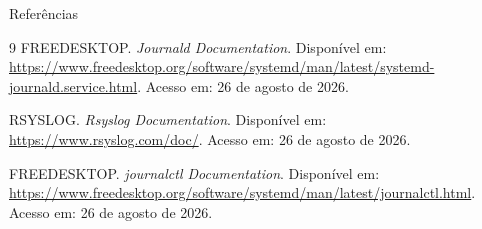 \documentclass{if-beamer}
\begin{document}

\begin{frame}[allowframebreaks]{Referências}
	\begin{thebibliography}{9}
		FREEDESKTOP. \textit{Journald Documentation}. Disponível em: \url{https://www.freedesktop.org/software/systemd/man/latest/systemd-journald.service.html}. Acesso em: 26 de agosto de 2026.
		
		RSYSLOG. \textit{Rsyslog Documentation}. Disponível em: \url{https://www.rsyslog.com/doc/}. Acesso em: 26 de agosto de 2026.
		
		FREEDESKTOP. \textit{journalctl Documentation}. Disponível em: \url{https://www.freedesktop.org/software/systemd/man/latest/journalctl.html}. Acesso em: 26 de agosto de 2026.
	\end{thebibliography}
\end{frame}	
\end{document}
